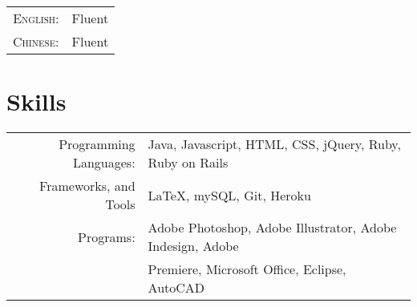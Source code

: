 \documentclass[letterpaper,10pt]{article} %
\begin{document}
\begin{tabular}{rl}
\textsc{English:} & Fluent\\

\textsc{Chinese:} & Fluent\\
\end{tabular}


\section{Skills}

\begin{tabular}{rl}
Programming Languages: & Java, Javascript, HTML, CSS, jQuery, Ruby, Ruby on Rails\\
Frameworks, and Tools & LaTeX, mySQL, Git, Heroku \\
Programs: & Adobe Photoshop, Adobe Illustrator, Adobe Indesign, Adobe \\
& Premiere, Microsoft Office, Eclipse, AutoCAD
\end{tabular}

\end{document}
